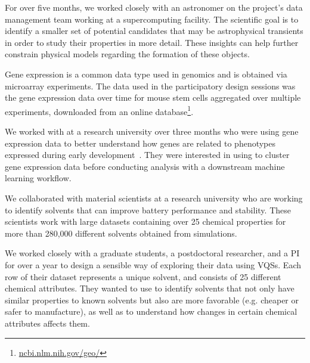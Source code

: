 For over five months, we worked closely with an astronomer on the project's data management team working at a supercomputing facility.  The scientific goal is to identify a smaller set of potential candidates that may be astrophysical transients in order to study their properties in more detail. These insights can help further constrain physical models regarding the formation of these objects.

 Gene expression is a common data type used in genomics and is obtained via microarray experiments.  The data used in the participatory design sessions was the gene expression data over time for mouse stem cells aggregated over multiple experiments, downloaded from an online database\footnote{\url{ncbi.nlm.nih.gov/geo/}}. 
\par  We worked with  at a research university over three months who were using gene expression data to better understand how genes are related to phenotypes expressed during early development~\cite{Peng2016,Gloss2017}. They were interested in using \zv to cluster gene expression data before conducting analysis with a downstream machine learning workflow. 

 We collaborated with material scientists at a research university who are working to identify solvents that can improve battery performance and stability. These scientists work with large datasets containing over 25 chemical properties for more than 280,000 different solvents obtained from simulations. 
\par We worked closely with a graduate students, a postdoctoral researcher, and a PI for over a year to design a sensible way of exploring their data using VQSs. Each row of their dataset represents a unique solvent, and consists of 25 different chemical attributes. They wanted to use \zv to identify solvents that not only have similar properties to known solvents but also are more favorable (e.g. cheaper or safer to manufacture), as well as to understand how changes in certain chemical attributes affects them.
\raggedbottom
